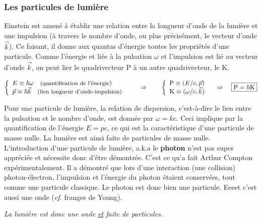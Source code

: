 \documentclass[11pt]{book}
\begin{document}
\subsubsection{Les particules de lumière}
Einstein est amené à établir une relation entre la longueur d'onde de la lumière et une impulsion (à travers le nombre d'onde, ou plus précisément, le vecteur d'onde $\vec{k}$). Ce faisant, il donne aux quantas d'énergie toutes les propriétés d'une particule. Comme l'énergie et liée à la pulsation $\omega$ et l'impulsion est lié au vecteur d'onde $\vec{k}$, on peut lier le quadrivecteur $\mathrm{P}$ à un autre quadrivecteur, le  $\mathrm{K}$.
\begin{center}
$\left\{ \begin{array}{l}
E \equiv \hbar \omega \quad \text{\small (quantification de l'énergie}) \\
\vec{p} \equiv \hbar \vec{k}  \quad \text{\small (lien longueur d'onde-impulsion)}
\end{array} \right.
\qquad \Rightarrow \qquad 
\left\{ \begin{array}{l}
\mathrm{P} \equiv (E/c, \vec{p}) \\
\mathrm{K} \equiv (\omega/c, \vec{k})
\end{array} \right. \quad \Rightarrow \quad \boxed{\mathrm{P} = \hbar \mathrm{K}}$
\end{center}
Pour une particule de lumière, la relation de dispersion, c'est-à-dire le lien entre la pulsation et le nombre d'onde, est donnée par  $\omega = kc$. Ceci implique par la quantification de l'énergie $E = pc$, ce qui est la caractéristique d'une particule de masse nulle. La lumière est ainsi faite de particules de masse nulle. \\

L'introduction d'une particule de lumière, a.k.a le \textbf{photon} n'est pas super appréciée et nécessite donc d'être démontrée. C'est ce qu'a fait Arthur Compton expérimentalement. Il a démontré que lors d'une interaction (une collision) photon-électron, l'impulsion et l'énergie du photon étaient conservées, tout comme une particule classique. Le photon est donc bien une particule. Eeeet c'est aussi une onde (\textit{cf.} franges de Young). 
\begin{center}
\begin{large}
\textit{La lumière est donc une onde \underline{et} faite de particules.}
\end{large}
\end{center}
\end{document}
